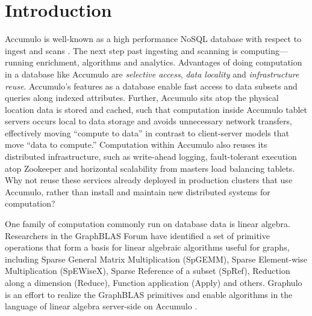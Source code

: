 
\section{Introduction}
\label{sIntro}
% 

Accumulo is well-known as a high performance NoSQL database with respect to ingest and scans \cite{sen2013benchmarking}.
The next step past ingesting and scanning is computing---running enrichment, algorithms and analytics.
Advantages of doing computation in a database like Accumulo %
are \emph{selective access}, \emph{data locality} and \emph{infrastructure reuse}.
Accumulo's features as a database enable fast access to data subsets and queries along indexed attributes.
Further, Accumulo sits atop the physical location data is stored and cached, such that computation inside
Accumulo tablet servers occurs local to data storage and avoids unnecessary network transfers,
effectively moving ``compute to data'' in contrast to client-server models that move ``data to compute.''
Computation within Accumulo also reuses its distributed infrastructure, 
such as write-ahead logging, fault-tolerant execution atop Zookeeper and 
horizontal scalability from masters load balancing tablets.
Why not reuse these services already deployed in production clusters that use Accumulo,
rather than install and maintain new distributed systems for computation?

One family of computation commonly run on database data is linear algebra.
Researchers in the GraphBLAS Forum \cite{mattson2014standards} have identified a set of primitive operations 
that form a basis for linear algebraic algorithms useful for graphs, including 
Sparse General Matrix Multiplication (SpGEMM),  Sparse Element-wise Multiplication (SpEWiseX),
Sparse Reference of a subset (SpRef), Reduction along a dimension (Reduce),
Function application (Apply) and others.
Graphulo is an effort to realize the GraphBLAS primitives 
and enable algorithms in the language of linear algebra server-side on Accumulo \cite{gadepally2015gabb}.


